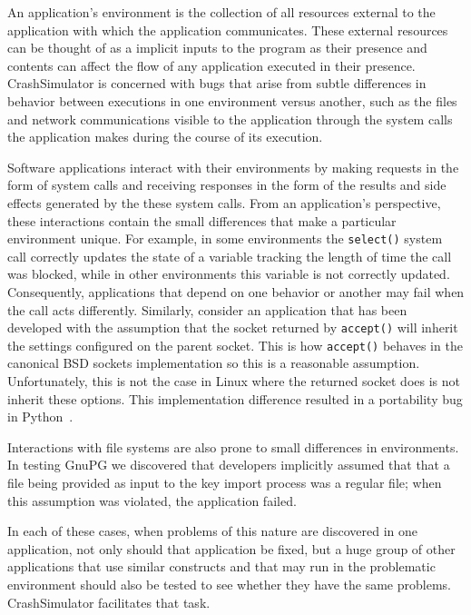 
An application's environment is the collection of all resources external to the application with which the
application communicates.  These external resources can be thought of as a implicit inputs to the program as their
presence and contents can affect the flow of any application executed in their presence. CrashSimulator is concerned with
bugs that arise from subtle differences in behavior between executions in one environment versus another,
such as the files and network communications visible 
to the application through the system calls the application
makes during the course of its execution.

Software applications interact with their environments by making requests in the form of system calls and receiving
responses in the form of the results and side effects generated by the these system calls.  From an application's
perspective, these interactions contain the small differences that make a particular environment unique.  For example,
in some environments the {\tt select()} system call correctly updates the state of a variable tracking the
length of time the call was blocked, while in other environments this variable is not correctly updated.  Consequently,
applications that depend on one behavior or another may fail when the call acts differently. Similarly, consider an
application that has been developed with the assumption that the socket returned by {\tt accept()} will inherit the
settings configured on the parent socket.  This is how {\tt accept()} behaves in the canonical BSD sockets
implementation so this is a reasonable assumption.  Unfortunately, this is not the case in Linux
where the returned socket does is not inherit these options.  This implementation difference resulted in a portability
bug in Python~\cite{Zhuang_NSDI_2014}.

Interactions with file systems are also prone to small differences in environments.
In testing GnuPG we discovered that developers implicitly assumed that that a file being provided as input to the key
import process was a regular file; when this assumption was violated, the application failed.

In each of these cases, when problems of this nature are discovered in one application, not only should that application
be fixed, but a huge group of other applications that use similar constructs and that may run in the problematic
environment should also be tested to see whether they have the same problems. CrashSimulator facilitates that task.

